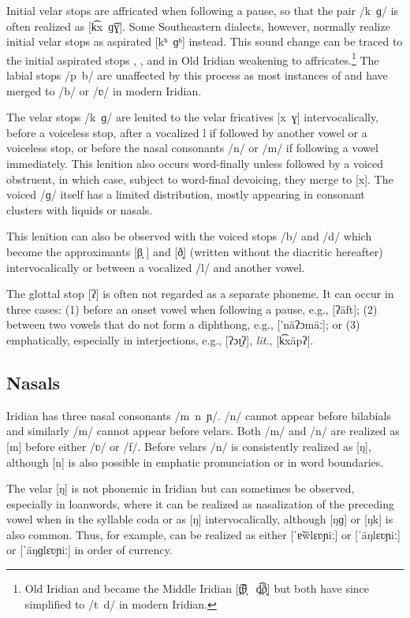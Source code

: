 \par Initial velar stops are affricated when following a pause, so that the pair /k~ɡ/ is often realized as [k͡x~ɡ͡ɣ]. Some Southeastern dialects, however, normally realize initial velar stops as aspirated [kʰ~ɡʰ] instead. This sound change can be traced to the initial aspirated stops , ,  and  in Old Iridian weakening to affricates.\footnote{Old Iridian  and  became the Middle Iridian [t̪͡θ̞ ~d̪͡ð̞] but both have since simplified to /t~d/ in modern Iridian.} The labial stops /{p~b}/ are unaffected by this process as most instances of  and  have merged to /b/ or /ʋ/ in modern Iridian.

The velar stops /k~ɡ/ are lenited to the velar fricatives [x~ɣ] intervocalically, before a voiceless stop, after a vocalized l if followed by another vowel or a voiceless stop, or before the nasal consonants /n/ or /m/ if following a vowel immediately. This lenition also occurs word-finally unless followed by a voiced obstruent, in which case, subject to word-final devoicing, they merge to [x]. The voiced /ɡ/ itself has a limited distribution, mostly appearing in consonant clusters with liquids or nasals.

This lenition can also be observed with the voiced stops /b/ and /d/ which become the approximants [β̞	] and [ð̞] (written without the diacritic hereafter) intervocalically or between a vocalized /l/ and another vowel.

The glottal stop [ʔ] is often not regarded as a separate phoneme.
It can occur in three cases: (1) before an onset vowel when following a pause, e.g.,  [ʔäft]; (2) between two vowels that do not form a diphthong, e.g.,  ['näʔɔmäː]; or (3) emphatically, especially in interjections, e.g.,  [ʔɔɪ̯ʔ],  \emph{lit.},  [k͡xäpʔ].


\subsection{Nasals}
Iridian has three nasal consonants /m~n~ɲ/. /n/ cannot appear before bilabials and similarly /m/ cannot appear before velars. Both /m/ and /n/ are realized as [m] before either /ʋ/ or /f/. Before velars /n/ is consistently realized as [ŋ], although [n] is also possible in emphatic pronunciation or in word boundaries.

The velar [ŋ] is not phonemic in Iridian but can sometimes be observed, especially in loanwords, where it can be realized as nasalization of the preceding vowel when in the syllable coda or as [ŋ] intervocalically, although [ŋɡ] or [ŋk] is also common. Thus, for example,  can be realized as either [ˈɐ̃w̃lɛʋɲiː] or [ˈäŋlɛʋɲiː] or [ˈäŋɡlɛʋɲiː] in order of currency.


